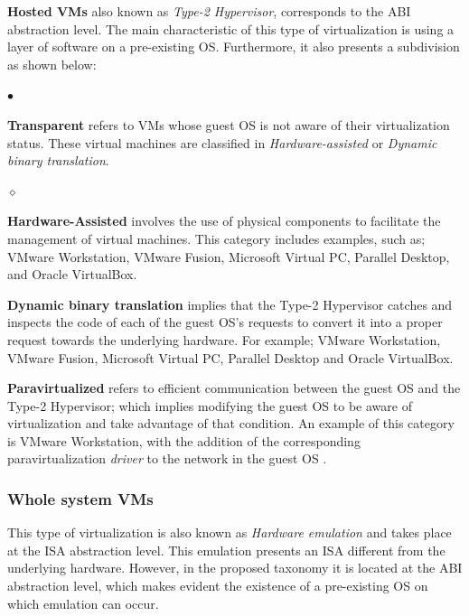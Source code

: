 	\textbf{Hosted VMs} also known as \textit{Type-2 Hypervisor}, corresponds to the ABI abstraction level. The main characteristic of this type of virtualization is using a layer of software on a pre-existing OS. Furthermore, it also presents a subdivision as shown below:
		
	\begin{list}{$\bullet$}{\setlength{\leftmargin}{5pt}}
		
			\item \textbf{Transparent} refers to VMs whose guest OS is not aware of their virtualization status. These virtual machines are classified in \textit{Hardware-assisted} or \textit{Dynamic binary translation}.
			
			\begin{list}{$\diamond$}{\setlength{\leftmargin}{8pt}}

				\item \textbf {Hardware-Assisted} involves the use of physical components to facilitate the management of virtual machines. This category includes examples, such as; VMware Workstation, VMware Fusion, Microsoft Virtual PC, Parallel Desktop, and Oracle VirtualBox.
				
				\item \textbf{Dynamic binary translation} implies that the Type-2 Hypervisor catches and inspects the code of each of the guest OS's requests to convert it into a proper request towards the underlying hardware. For example; VMware Workstation, VMware Fusion, Microsoft Virtual PC, Parallel Desktop and Oracle VirtualBox.
			\end{list}
			
			\item \textbf {Paravirtualized} refers to efficient communication between the guest OS and the Type-2 Hypervisor; which implies modifying the guest OS to be aware of virtualization and take advantage of that condition. An example of this category is VMware Workstation, with the addition of the corresponding paravirtualization \textit{driver} to the network in the guest OS \cite {VMware2018Website}.
			
		\end{list}	

	\subsubsection{Whole system VMs}
	This type of virtualization is also known as \textit{Hardware emulation} and takes place at the ISA abstraction level.  This emulation presents an ISA different from the underlying hardware. However, in the proposed taxonomy it is located at the ABI abstraction level, which makes evident the existence of a pre-existing OS on which emulation can occur.
	
